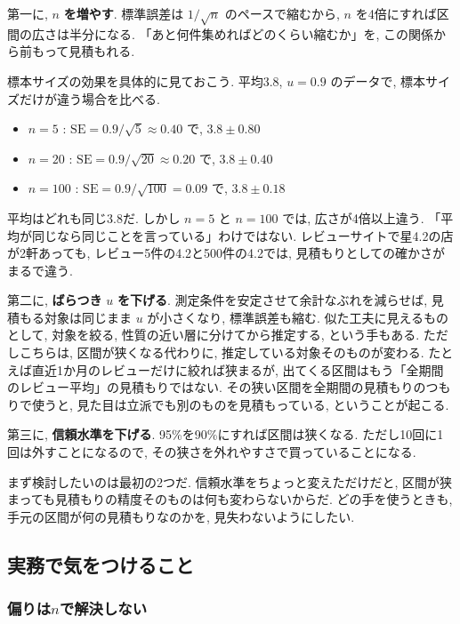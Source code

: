     第一に, $n$ \textbf{を増やす}.
    標準誤差は $1/\sqrt{n}$ のペースで縮むから, $n$ を4倍にすれば区間の広さは半分になる.
    「あと何件集めればどのくらい縮むか」を, この関係から前もって見積もれる.

    標本サイズの効果を具体的に見ておこう.
    平均3.8, $u = 0.9$ のデータで, 標本サイズだけが違う場合を比べる.
    \begin{itemize}
      \item $n = 5$ : $\mathrm{SE} = 0.9/\sqrt{5} \approx 0.40$ で, $3.8 \pm 0.80$
      \item $n = 20$ : $\mathrm{SE} = 0.9/\sqrt{20} \approx 0.20$ で, $3.8 \pm 0.40$
      \item $n = 100$ : $\mathrm{SE} = 0.9/\sqrt{100} = 0.09$ で, $3.8 \pm 0.18$
    \end{itemize}
    平均はどれも同じ3.8だ.
    しかし $n = 5$ と $n = 100$ では, 広さが4倍以上違う.
    「平均が同じなら同じことを言っている」わけではない.
    レビューサイトで星4.2の店が2軒あっても, レビュー5件の4.2と500件の4.2では, 見積もりとしての確かさがまるで違う.

    第二に, \textbf{ばらつき} $u$ \textbf{を下げる}.
    測定条件を安定させて余計なぶれを減らせば, 見積もる対象は同じまま $u$ が小さくなり, 標準誤差も縮む.
    似た工夫に見えるものとして, 対象を絞る, 性質の近い層に分けてから推定する, という手もある.
    ただしこちらは, 区間が狭くなる代わりに, 推定している対象そのものが変わる.
    たとえば直近1か月のレビューだけに絞れば狭まるが, 出てくる区間はもう「全期間のレビュー平均」の見積もりではない.
    その狭い区間を全期間の見積もりのつもりで使うと, 見た目は立派でも別のものを見積もっている, ということが起こる.

    第三に, \textbf{信頼水準を下げる}.
    95\%を90\%にすれば区間は狭くなる.
    ただし10回に1回は外すことになるので, その狭さを外れやすさで買っていることになる.

    まず検討したいのは最初の2つだ.
    信頼水準をちょっと変えただけだと, 区間が狭まっても見積もりの精度そのものは何も変わらないからだ.
    どの手を使うときも, 手元の区間が何の見積もりなのかを, 見失わないようにしたい.

  \subsection{実務で気をつけること}

    \subsubsection*{偏りは$n$で解決しない}

